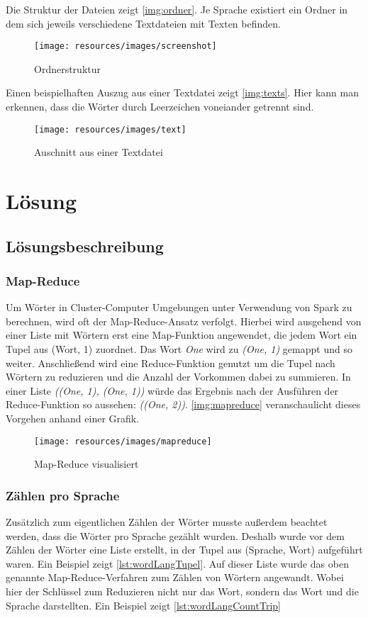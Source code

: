 \documentclass[chapterprefix=true, 12pt, a4paper, oneside, parskip=half, listof=totoc, bibliography=totoc, numbers=noendperiod]{scrbook}
\begin{document}
Die Struktur der Dateien zeigt \autoref{img:ordner}. Je Sprache existiert ein Ordner in dem sich jeweils verschiedene Textdateien mit Texten befinden. 
\begin{figure}[H]
	\texttt{[image: resources/images/screenshot]}
	\caption{Ordnerstruktur}
	\label{img:ordner}
\end{figure}

Einen beispielhaften Auszug aus einer Textdatei zeigt \autoref{img:texts}. Hier kann man erkennen, dass die Wörter durch Leerzeichen voneiander getrennt sind.
\begin{figure}[H]
	\texttt{[image: resources/images/text]}
	\caption{Auschnitt aus einer Textdatei}
	\label{img:texts}
\end{figure}	

\chapter{Lösung}
\section{Lösungsbeschreibung}
\subsection{Map-Reduce}
Um Wörter in Cluster-Computer Umgebungen unter Verwendung von Spark zu berechnen, wird oft der Map-Reduce-Ansatz verfolgt. Hierbei wird ausgehend von einer Liste mit Wörtern erst eine Map-Funktion angewendet, die jedem Wort ein Tupel aus (Wort, 1) zuordnet. Das Wort \textit{One} wird zu \textit{(One, 1)} gemappt und so weiter. Anschließend wird eine Reduce-Funktion genutzt um die Tupel nach Wörtern zu reduzieren und die Anzahl der Vorkommen dabei zu summieren. In einer Liste \textit{((One, 1), (One, 1))} würde das Ergebnis nach der Ausführen der Reduce-Funktion so aussehen: \textit{((One, 2))}. \autoref{img:mapreduce} veranschaulicht dieses Vorgehen anhand einer Grafik.
\begin{figure}[H]
	\texttt{[image: resources/images/mapreduce]}
	\caption{Map-Reduce visualisiert \cite{SUN20}}
	\label{img:mapreduce}
\end{figure}

\subsection{Zählen pro Sprache}
Zusätzlich zum eigentlichen Zählen der Wörter musste außerdem beachtet werden, dass die Wörter pro Sprache gezählt wurden. Deshalb wurde vor dem Zählen der Wörter eine Liste erstellt, in der Tupel aus (Sprache, Wort) aufgeführt waren. Ein Beispiel zeigt  \autoref{lst:wordLangTupel}. \newline
Auf dieser Liste wurde das oben genannte Map-Reduce-Verfahren zum Zählen von Wörtern angewandt. Wobei hier der Schlüssel zum Reduzieren nicht nur das Wort, sondern das Wort und die Sprache darstellten.  Ein Beispiel zeigt \autoref{lst:wordLangCountTrip}
\end{document}
